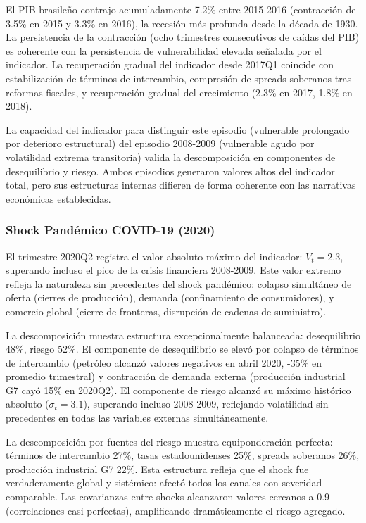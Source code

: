 \documentclass[3p,11pt,draft,natbib=false]{elsarticle}
\begin{document}
El PIB brasileño contrajo acumuladamente 7.2\% entre 2015-2016 (contracción de 3.5\% en 2015 y 3.3\% en 2016), la recesión más profunda desde la década de 1930. La persistencia de la contracción (ocho trimestres consecutivos de caídas del PIB) es coherente con la persistencia de vulnerabilidad elevada señalada por el indicador. La recuperación gradual del indicador desde 2017Q1 coincide con estabilización de términos de intercambio, compresión de spreads soberanos tras reformas fiscales, y recuperación gradual del crecimiento (2.3\% en 2017, 1.8\% en 2018).

La capacidad del indicador para distinguir este episodio (vulnerable prolongado por deterioro estructural) del episodio 2008-2009 (vulnerable agudo por volatilidad extrema transitoria) valida la descomposición en componentes de desequilibrio y riesgo. Ambos episodios generaron valores altos del indicador total, pero sus estructuras internas difieren de forma coherente con las narrativas económicas establecidas.

\subsubsection{Shock Pandémico COVID-19 (2020)}

El trimestre 2020Q2 registra el valor absoluto máximo del indicador: $V_t = 2.3$, superando incluso el pico de la crisis financiera 2008-2009. Este valor extremo refleja la naturaleza sin precedentes del shock pandémico: colapso simultáneo de oferta (cierres de producción), demanda (confinamiento de consumidores), y comercio global (cierre de fronteras, disrupción de cadenas de suministro).

La descomposición muestra estructura excepcionalmente balanceada: desequilibrio 48\%, riesgo 52\%. El componente de desequilibrio se elevó por colapso de términos de intercambio (petróleo alcanzó valores negativos en abril 2020, -35\% en promedio trimestral) y contracción de demanda externa (producción industrial G7 cayó 15\% en 2020Q2). El componente de riesgo alcanzó su máximo histórico absoluto ($\sigma_t = 3.1$), superando incluso 2008-2009, reflejando volatilidad sin precedentes en todas las variables externas simultáneamente.

La descomposición por fuentes del riesgo muestra equiponderación perfecta: términos de intercambio 27\%, tasas estadounidenses 25\%, spreads soberanos 26\%, producción industrial G7 22\%. Esta estructura refleja que el shock fue verdaderamente global y sistémico: afectó todos los canales con severidad comparable. Las covarianzas entre shocks alcanzaron valores cercanos a 0.9 (correlaciones casi perfectas), amplificando dramáticamente el riesgo agregado.
\end{document}
